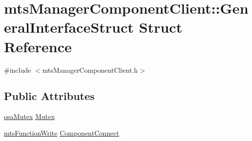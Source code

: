 \hypertarget{structmts_manager_component_client_1_1_general_interface_struct}{\section{mts\-Manager\-Component\-Client\-:\-:General\-Interface\-Struct Struct Reference}
\label{structmts_manager_component_client_1_1_general_interface_struct}
}


{\ttfamily \#include $<$mts\-Manager\-Component\-Client.\-h$>$}

\subsection*{Public Attributes}
\begin{DoxyCompactItemize}
\item 
\hyperlink{classosa_mutex}{osa\-Mutex} \hyperlink{structmts_manager_component_client_1_1_general_interface_struct_a4a55011d39513a9c87772939b0a23aad}{Mutex}
\item 
\hyperlink{classmts_function_write}{mts\-Function\-Write} \hyperlink{structmts_manager_component_client_1_1_general_interface_struct_ac3601e8c80ad2c325e9de360c7d12c7d}{Component\-Connect}
\end{DoxyCompactItemize}



